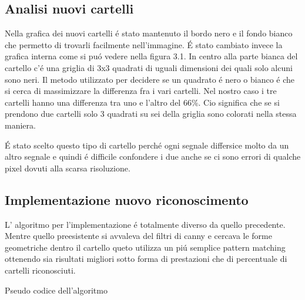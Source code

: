 	\subsection{Analisi nuovi cartelli}
		Nella grafica dei nuovi cartelli \'e stato mantenuto il bordo nero e il fondo bianco che permetto di trovarli facilmente nell'immagine. \'E stato cambiato invece la grafica interna come si pu\'o vedere nella figura 3.1. In centro alla parte bianca del cartello c'\'e una griglia di 3x3  quadrati di uguali dimensioni dei quali solo alcuni sono neri. Il metodo utilizzato per decidere se un quadrato \'e nero o bianco \'e che si cerca di massimizzare la differenza fra i vari cartelli. Nel nostro caso i tre cartelli hanno una differenza tra uno e l'altro del 66\%. Cio significa che se si prendono due cartelli solo 3 quadrati su sei della griglia sono colorati nella stessa maniera.
		
		\'E stato scelto questo tipo di cartello perch\'e ogni segnale differsice molto da un altro segnale e quindi \'e difficile confondere i due anche se ci sono errori di qualche pixel dovuti alla scarsa risoluzione.

	\subsection{Implementazione nuovo riconoscimento}
		L' algoritmo per l'implementazione \'e totalmente diverso da quello precedente. Mentre quello preesistente si avvaleva del filtri di canny e cercava le forme geometriche dentro il cartello queto utilizza un pi\'u semplice pattern matching ottenendo sia risultati migliori sotto forma di prestazioni che di percentuale di cartelli riconosciuti.\newline

		\begin{algorithm}[htp]
		\SetAlgoLined
		\caption{Pseudo codice dell'algoritmo}
		\end{algorithm}

